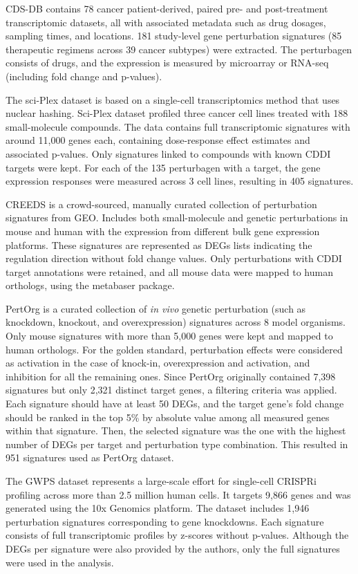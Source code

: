 \gls{CDS-DB} contains 78 cancer patient-derived, paired pre- and post-treatment transcriptomic datasets, all with associated metadata such as drug dosages, sampling times, and locations. 181 study-level gene perturbation signatures (85 therapeutic regimens across 39 cancer subtypes) were extracted. The perturbagen consists of drugs, and the expression is measured by microarray or \gls{RNA-seq} (including fold change and p-values). 

The sci-Plex dataset is based on a single-cell transcriptomics method that uses nuclear hashing. Sci-Plex dataset profiled three cancer cell lines treated with 188 small-molecule compounds. The data contains full transcriptomic signatures with around 11,000 genes each, containing dose-response effect estimates and associated p-values. Only signatures linked to compounds with known \gls{CDDI} targets were kept. For each of the 135 perturbagen with a target, the gene expression responses were measured across 3 cell lines, resulting in 405 signatures. 

\gls{CREEDS} is a crowd-sourced, manually curated collection of perturbation signatures from \gls{GEO}. Includes both small-molecule and genetic perturbations in mouse and human with the expression from different bulk gene expression platforms. These signatures are represented as \gls{DEGs} lists indicating the regulation direction without fold change values. Only perturbations with \gls{CDDI} target annotations were retained, and all mouse data were mapped to human orthologs, using the metabaser package.

PertOrg is a curated collection of \textit{in vivo} genetic perturbation (such as knockdown, knockout, and overexpression) signatures across 8 model organisms. Only mouse signatures with more than 5,000 genes were kept and mapped to human orthologs. For the golden standard, perturbation effects were considered as activation in the case  of knock-in, overexpression and activation, and inhibition for all the remaining ones. Since PertOrg originally contained 7,398 signatures but only 2,321 distinct target genes, a filtering criteria was applied. Each signature should have at least 50 \gls{DEGs}, and the target gene's fold change should be ranked in the top 5\% by absolute value among all measured genes within that signature. Then, the selected signature was the one with the highest number of \gls{DEGs} per target and perturbation type combination. This resulted in 951 signatures used as PertOrg dataset.

The \gls{GWPS} dataset represents a large-scale effort for single-cell \gls{CRISPR}i profiling across more than 2.5 million human cells. It targets 9,866 genes and was generated using the 10x Genomics platform. The dataset includes 1,946 perturbation signatures corresponding to gene knockdowns. Each signature consists of full transcriptomic profiles by z-scores without p-values. Although the \gls{DEGs} per signature were also provided by the authors, only the full signatures were used in the analysis.

